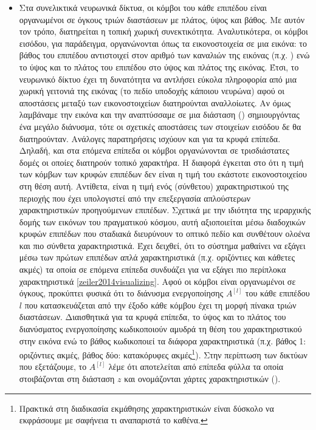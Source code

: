\begin{itemize}
  \item Στα συνελικτικά νευρωνικά δίκτυα, οι κόμβοι του κάθε επιπέδου είναι οργανωμένοι σε όγκους τριών διαστάσεων με πλάτος, ύψος και βάθος. Με αυτόν τον τρόπο, διατηρείται η τοπική χωρική συνεκτικότητα. Αναλυτικότερα, οι κόμβοι εισόδου, για παράδειγμα, οργανώνονται όπως τα εικονοστοιχεία σε μια εικόνα: το βάθος του επιπέδου αντιστοιχεί στον αριθμό των καναλιών της εικόνας (π.χ. ) ενώ το ύψος και το πλάτος του επιπέδου στο ύψος και πλάτος της εικόνας. Έτσι, το νευρωνικό δίκτυο έχει τη δυνατότητα να αντλήσει εύκολα πληροφορία από μια χωρική γειτονιά της εικόνας (το πεδίο υποδοχής κάποιου νευρώνα) αφού οι αποστάσεις μεταξύ των εικονοστοιχείων διατηρούνται αναλλοίωτες. Αν όμως λαμβάναμε την εικόνα και την αναπτύσσαμε σε μια διάσταση () σημιουργόντας ένα μεγάλο διάνυσμα, τότε οι σχετικές αποστάσεις των στοιχείων εισόδου δε θα διατηρούνταν. Ανάλογες παρατηρήσεις ισχύουν και για τα κρυφά επίπεδα. Δηλαδή, και στα επόμενα επίπεδα οι κόμβοι οργανώνονται σε τρισδιάστατες δομές οι οποίες διατηρούν τοπικό χαρακτήρα. Η διαφορά έγκειται στο ότι η τιμή των κόμβων των κρυφών επιπέδων δεν είναι η τιμή του εκάστοτε εικονοστοιχείου στη θέση αυτή. Αντίθετα, είναι η τιμή ενός (σύνθετου) χαρακτηριστικού της περιοχής που έχει υπολογιστεί από την επεξεργασία απλούστερων χαρακτηριστικών προηγούμενων επιπέδων. Σχετικά με την ιδιότητα της ιεραρχικής δομής των εικόνων του πραγματικού κόσμου, αυτή αξιοποιείται μέσω διαδοχικών κρυφών επιπέδων που σταδιακά διευρύνουν το οπτικό πεδίο και συνθέτουν ολοένα και πιο σύνθετα χαρακτηριστικά. Έχει δειχθεί, ότι το σύστημα μαθαίνει να εξάγει μέσω των πρώτων επιπέδων απλά χαρακτηριστικά (π.χ. οριζόντιες και κάθετες ακμές) τα οποία σε επόμενα επίπεδα συνδυάζει για να εξάγει πιο περίπλοκα χαρακτηριστικά \ref{zeiler2014visualizing}. Αφού οι κόμβοι είναι οργανωμένοι σε όγκους, προκύπτει φυσικά ότι το διάνυσμα ενεργοποίησης $A^{[l]}$ του κάθε επιπέδου $l$ που κατασκευάζεται από την έξοδο κάθε κόμβου έχει τη μορφή πίνακα τριών διαστάσεων. Διαισθητικά για τα κρυφά επίπεδα, το ύψος και το πλάτος του διανύσματος ενεργοποίησης κωδικοποιούν αμυδρά τη θέση του χαρακτηριστικού στην εικόνα ενώ το βάθος κωδικοποιεί τα διάφορα χαρακτηριστικά (π.χ. βάθος 1: οριζόντιες ακμές, βάθος δύο: κατακόρυφες ακμές\footnote{Πρακτικά στη διαδικασία εκμάθησης χαρακτηριστικών είναι δύσκολο να εκφράσουμε με σαφήνεια τι αναπαριστά το καθένα.}). Στην περίπτωση των δικτύων που εξετάζουμε, το $A^{[l]}$ λέμε ότι αποτελείται από επίπεδα φύλλα τα οποία στοιβάζονται στη διάσταση $z$ και ονομάζονται χάρτες χαρακτηριστικών ().
  

\end{itemize}
